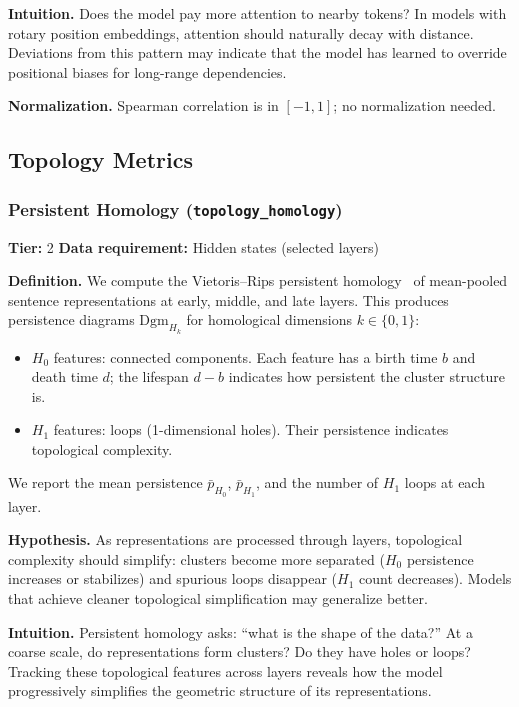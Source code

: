 \documentclass{article}
\begin{document}
\textbf{Intuition.}
Does the model pay more attention to nearby tokens? In models with rotary position embeddings, attention should naturally decay with distance. Deviations from this pattern may indicate that the model has learned to override positional biases for long-range dependencies.

\textbf{Normalization.} Spearman correlation is in $[-1, 1]$; no normalization needed.

\subsection{Topology Metrics}
\label{app:topology}

\subsubsection{Persistent Homology (\texttt{topology\_homology})}
\label{app:homology}

\textbf{Tier:} 2 \quad \textbf{Data requirement:} Hidden states (selected layers)

\textbf{Definition.}
We compute the Vietoris--Rips persistent homology~\citep{naitzat2020topology} of mean-pooled sentence representations at early, middle, and late layers. This produces persistence diagrams $\text{Dgm}_{H_k}$ for homological dimensions $k \in \{0, 1\}$:
\begin{itemize}
  \item $H_0$ features: connected components. Each feature has a birth time $b$ and death time $d$; the lifespan $d - b$ indicates how persistent the cluster structure is.
  \item $H_1$ features: loops (1-dimensional holes). Their persistence indicates topological complexity.
\end{itemize}
We report the mean persistence $\bar{p}_{H_0}$, $\bar{p}_{H_1}$, and the number of $H_1$ loops at each layer.

\textbf{Hypothesis.}
As representations are processed through layers, topological complexity should simplify: clusters become more separated ($H_0$ persistence increases or stabilizes) and spurious loops disappear ($H_1$ count decreases). Models that achieve cleaner topological simplification may generalize better.

\textbf{Intuition.}
Persistent homology asks: ``what is the shape of the data?'' At a coarse scale, do representations form clusters? Do they have holes or loops? Tracking these topological features across layers reveals how the model progressively simplifies the geometric structure of its representations.
\end{document}

